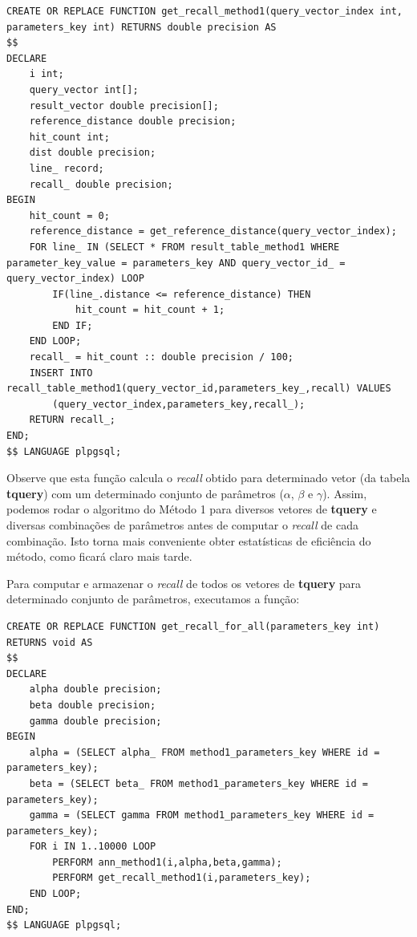 \documentclass[a4paper,12pt,titlepage]{scrartcl}
\begin{document}
\begin{lstlisting}[caption = Calculando o \emph{recall} no Método 1., label = recallfunc]
CREATE OR REPLACE FUNCTION get_recall_method1(query_vector_index int, parameters_key int) RETURNS double precision AS
$$
DECLARE
	i int;
	query_vector int[];
	result_vector double precision[];
	reference_distance double precision;
	hit_count int;
	dist double precision;
	line_ record;
	recall_ double precision;
BEGIN
	hit_count = 0;
	reference_distance = get_reference_distance(query_vector_index);
	FOR line_ IN (SELECT * FROM result_table_method1 WHERE parameter_key_value = parameters_key AND query_vector_id_ = query_vector_index) LOOP
		IF(line_.distance <= reference_distance) THEN
			hit_count = hit_count + 1;
		END IF;
	END LOOP;
	recall_ = hit_count :: double precision / 100;
	INSERT INTO recall_table_method1(query_vector_id,parameters_key_,recall) VALUES
		(query_vector_index,parameters_key,recall_);
	RETURN recall_;
END;
$$ LANGUAGE plpgsql;

\end{lstlisting}
\vspace{5mm}

Observe que esta função calcula o \emph{recall} obtido para determinado vetor (da tabela \textbf{tquery}) com um determinado conjunto de parâmetros ($\alpha$, $\beta$ e $\gamma$). Assim, podemos rodar o algoritmo do Método 1 para diversos vetores de \textbf{tquery} e diversas combinações de parâmetros antes de computar o \emph{recall} de cada combinação. Isto torna mais conveniente obter estatísticas de eficiência do método, como ficará claro mais tarde. 

Para computar e armazenar o \emph{recall} de todos os vetores de \textbf{tquery} para determinado conjunto de parâmetros, executamos a função:\\

\begin{lstlisting}[caption = Computando o \emph{recall} para todos os vetores de \textbf{tquery}., label = recalltodos1]
CREATE OR REPLACE FUNCTION get_recall_for_all(parameters_key int) RETURNS void AS
$$
DECLARE
	alpha double precision;
	beta double precision;
	gamma double precision;
BEGIN
	alpha = (SELECT alpha_ FROM method1_parameters_key WHERE id = parameters_key);
	beta = (SELECT beta_ FROM method1_parameters_key WHERE id = parameters_key);
	gamma = (SELECT gamma FROM method1_parameters_key WHERE id = parameters_key);
	FOR i IN 1..10000 LOOP
		PERFORM ann_method1(i,alpha,beta,gamma);
		PERFORM get_recall_method1(i,parameters_key);
	END LOOP;
END;
$$ LANGUAGE plpgsql;

\end{lstlisting}
\vspace{5mm}
\end{document}
